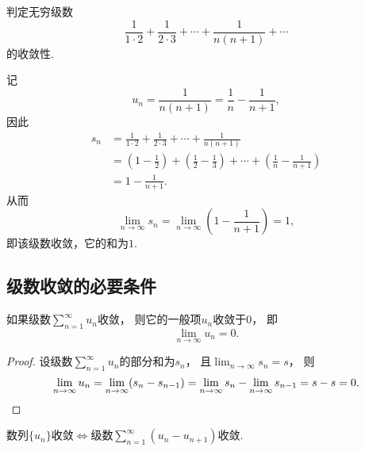 \begin{example}
判定无穷级数\[
	\frac{1}{1\cdot2}+\frac{1}{2\cdot3}+\dotsb+\frac{1}{n(n+1)}+\dotsb
\]的收敛性.
\begin{solution}
记\[
	u_n = \frac{1}{n(n+1)} = \frac{1}{n}-\frac{1}{n+1},
\]
因此\begin{align*}
	s_n &= \frac{1}{1\cdot2}+\frac{1}{2\cdot3}+\dotsb+\frac{1}{n(n+1)} \\
	&= \left(1-\frac{1}{2}\right)+\left(\frac{1}{2}-\frac{1}{3}\right)
	+\dotsb+\left(\frac{1}{n}-\frac{1}{n+1}\right) \\
	&= 1-\frac{1}{n+1}.
\end{align*}
从而\[
	\lim_{n\to\infty} s_n
	= \lim_{n\to\infty} \left(1-\frac{1}{n+1}\right)
	= 1,
\]
即该级数收敛，它的和为\(1\).
\end{solution}
\end{example}

\subsection{级数收敛的必要条件}
\begin{proposition}[级数收敛的必要条件]\label{theorem:无穷级数.级数收敛的必要条件}
如果级数\(\sum_{n=1}^\infty u_n\)收敛，
则它的一般项\(u_n\)收敛于\(0\)，
即\[
	\lim_{n\to\infty} u_n = 0.
\]
\begin{proof}
设级数\(\sum_{n=1}^\infty u_n\)的部分和为\(s_n\)，
且\(\lim_{n\to\infty} s_n = s\)，
则\[
	\lim_{n\to\infty} u_n
	= \lim_{n\to\infty}(s_n - s_{n-1})
	= \lim_{n\to\infty} s_n - \lim_{n\to\infty} s_{n-1}
	= s - s
	= 0.
	\qedhere
\]
\end{proof}
\end{proposition}
\begin{remark}
数列\(\{u_n\}\)收敛\(\iff\)级数\(\sum_{n=1}^\infty (u_n - u_{n+1})\)收敛.
\end{remark}

